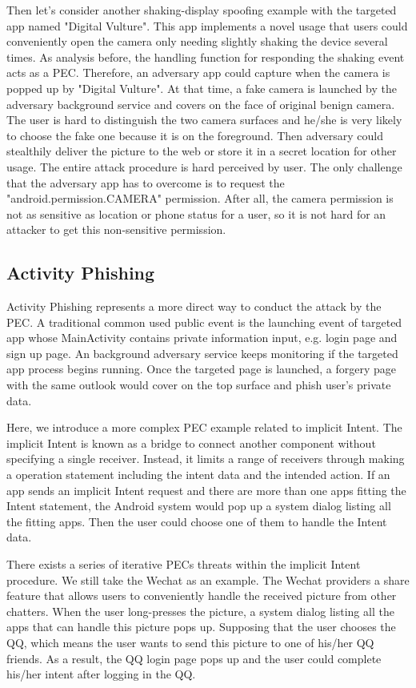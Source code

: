 \documentclass{sig-alternate-05-2015}
\begin{document}
Then let's consider another shaking-display spoofing example with the targeted app named "Digital Vulture". This app implements a novel usage that users could conveniently open the camera only needing slightly shaking the device several times. As analysis before, the handling function for responding the shaking event acts as a PEC. Therefore, an adversary app could capture when the camera is popped up by "Digital Vulture". At that time, a fake camera is launched by the adversary background service and covers on the face of original benign camera. The user is hard to distinguish the two camera surfaces and he/she is very likely to choose the fake one because it is on the foreground. Then adversary could stealthily deliver the picture to the web or store it in a secret location for other usage. The entire attack procedure is hard perceived by user. The only challenge that the adversary app has to overcome is to request the  "android.permission.CAMERA" permission. After all, the camera permission is not as sensitive as location or phone status for a user, so it is not hard for an attacker to get this non-sensitive permission.

\subsection{Activity Phishing}
Activity Phishing represents a more direct way to conduct the attack by the PEC. A traditional common used public event is the launching event of targeted app whose MainActivity contains private information input, e.g. login page and sign up page. An background adversary service keeps monitoring if the targeted app process begins running. Once the targeted page is launched, a forgery page with the same outlook would cover on the top surface and phish user's private data.

Here, we introduce a more complex PEC example related to implicit Intent. The implicit Intent is known as a bridge to connect another component without specifying a single receiver. Instead, it limits a range of receivers through making a operation statement including the intent data and the intended action. If an app sends an implicit Intent request and there are more than one apps fitting the Intent statement, the Android system would pop up a system dialog listing all the fitting apps. Then the user could choose one of them to handle the Intent data.

There exists a series of iterative PECs threats within the implicit Intent procedure. We still take the Wechat as an example. The Wechat providers a share feature that allows users to conveniently handle the received picture from other chatters. When the user long-presses the picture, a system dialog listing all the apps that can handle this picture pops up. Supposing that the user chooses the QQ, which means the user wants to send this picture to one of his/her QQ friends. As a result, the QQ login page pops up and the user could complete his/her intent after logging in the QQ.
\end{document}
